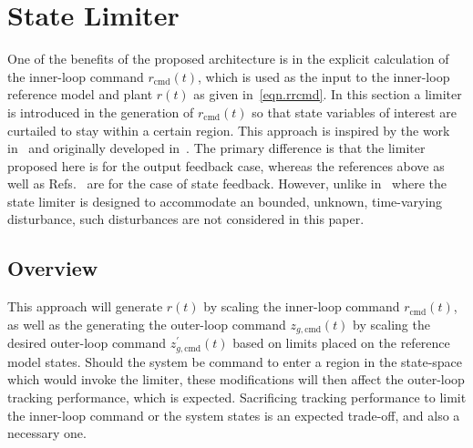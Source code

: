 \documentclass[journal]{IEEEtran}
\theoremstyle{innercustomthm}
\begin{document}
  \section{State Limiter}\label{sec.outerLoop.stateLimiting}

  One of the benefits of the proposed architecture is in the explicit calculation of the inner-loop command $r_{\text{cmd}}(t)$, which is used as the input to the inner-loop reference model and plant $r(t)$ as given in\ \eqref{eqn.rrcmd}.
  In this section a limiter is introduced in the generation of $r_{\text{cmd}}(t)$ so that state variables of interest are curtailed to stay within a certain region.
  This approach is inspired by the work in\ \cite{gadient.statelimter.2011, lavretsky.statelimiting.2010, lavretskywise.book.2013} and originally developed in\ \cite{sanner.gaussian.1992}.
  The primary difference is that the limiter proposed here is for the output feedback case, whereas the references above as well as Refs.\ \cite{famularo.stateconstraints.2016, muse.constraints.2011} are for the case of state feedback.
  However, unlike in\ \cite{lavretskywise.book.2013} where the state limiter is designed to accommodate an bounded, unknown, time-varying disturbance, such disturbances are not considered in this paper.

  \subsection{Overview}

   This approach will generate $r(t)$ by scaling the inner-loop command $r_{\text{cmd}}(t)$, as well as the generating the outer-loop command $z_{g,\text{cmd}}(t)$ by scaling the desired outer-loop command $z_{g,\text{cmd}}^{\prime}(t)$ based on limits placed on the reference model states.
   Should the system be command to enter a region in the state-space which would invoke the limiter, these modifications will then affect the outer-loop tracking performance, which is expected.
   Sacrificing tracking performance to limit the inner-loop command or the system states is an expected trade-off, and also a necessary one.
\end{document}
